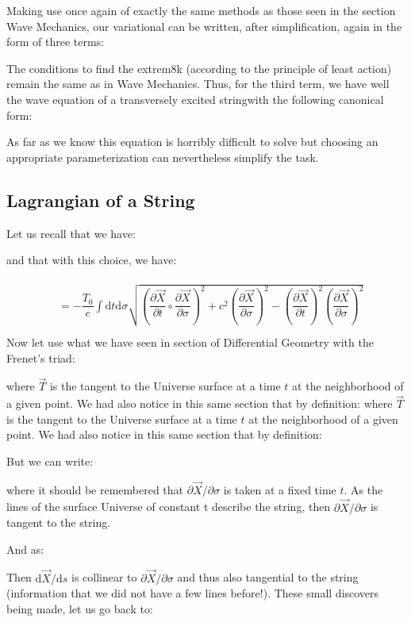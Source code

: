 	Making use once again of exactly the same methods as those seen in the section Wave Mechanics, our variational can be written, after simplification, again in the form of three terms:
	
	The conditions to find the extrem8k (according to the principle of least action) remain the same as in Wave Mechanics. Thus, for the third term, we have well the wave equation of a transversely excited stringwith the following canonical form:
	
	As far as we know this equation is horribly difficult to solve but choosing an appropriate parameterization can nevertheless simplify the task.
	
	\subsection{Lagrangian of a String}
	Let us recall that we have:
	
	and that with this choice, we have:
	
	\begin{gather*}
		\begin{aligned}
		&=-\dfrac{T_0}{c}\int \mathrm{d}t\mathrm{d}\sigma\sqrt{\left(\dfrac{\partial \vec{X}}{\partial t}\circ\dfrac{\partial \vec{X}}{\partial \sigma}\right)^2+c^2\left(\dfrac{\partial \vec{X}}{\partial \sigma}\right)^2-\left(\dfrac{\partial \vec{X}}{\partial t}\right)^2\left(\dfrac{\partial \vec{X}}{\partial \sigma}\right)^2}\\
		\end{aligned}
	\end{gather*}
	Now let use what we have seen in section of Differential Geometry with the Frenet's triad:
	
	where $\vec{T}$ is the tangent to the Universe surface at a time $t$ at the neighborhood of a given point. We had also notice in this same section that by definition:
	where $\vec{T}$ is the tangent to the Universe surface at a time $t$ at the neighborhood of a given point. We had also notice in this same section that by definition:
	
	But we can write:
	
	where it should be remembered that $\partial \vec{X}/\partial \sigma$ is taken at a fixed time $t$. As the lines of the surface Universe of constant $ $t describe the string, then $\partial \vec{X}/\partial \sigma$ is tangent to the string.

	And as:
	
	Then $\mathrm{d}\vec{X}/\mathrm{d}s$ is collinear to $\partial \vec{X}/\partial \sigma$ and thus also tangential to the string (information that we did not have a few lines before!). These small discovers being made, let us go back to:
	
